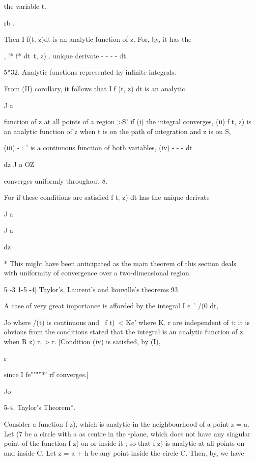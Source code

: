 {{the variable t.

rb .

Then I f(t, z)dt is an analytic function of z. For, by, it has
the

, !* f* dt\ t, z) . unique derivate - - - - dt.

5*32. Analytic functions represented hy infinite integrals.

From (II) corollary, it follows that I f (t, z) dt is an
analytic

J a

function of z at all points of a region >S' if (i) the integral
converges, (ii) f t, z) is an analytic function of z when t is on the
path of integration and z is on S,

(iii) - : ' is a continuous function of both variables, (iv) - - - dt

dz J a OZ

converges uniformly throughout 8.

For if these conditions are satisfied f t, z) dt has the unique
derivate

J a

J a

dz

* This might have been anticipated as the main theorem of this section
deals with uniformity of convergence over a two-dimensional region.

5 -3 1-5 -4] Taylor's, Laurent's and liouville's theorems 93

A case of very great importance is afforded by the integral I e~' /(0
dt,

Jo where /(t) is continuous and \ f t)\ < Ke' where K, r are
independent of t; it is obvious from the conditions stated that the
integral is an analytic function of z when R z) r, > r. [Condition
(iv) is satisfied, by (I),

r

since I fe"""''*' rf converges.]

Jo

5-4. Taylor's Theorem*.

Consider a function f z), which is analytic in the neighbourhood of a
point z = a. Let (7 be a circle with a as centre in the -plane, which
does not have any singular point of the function f z) on or inside it
; so that f z) is analytic at all points on and inside C. Let z = a +
h be any point inside the circle C. Then, by, we have

}}
